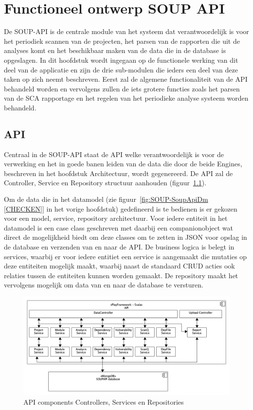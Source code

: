 
\chapter{Functioneel ontwerp SOUP API}\label{ch:impl soup api}
De SOUP-API is de centrale module van het systeem dat verantwoordelijk is voor het periodiek scannen van de projecten, het parsen van de rapporten die uit de analyses komt en het beschikbaar maken van de data die in de database is opgeslagen. In dit hoofdstuk wordt  ingegaan op de functionele werking van dit deel van de applicatie en zijn de drie sub-modulen die ieders een deel van deze taken op zich neemt beschreven. Eerst zal de algemene functionaliteit van de API behandeld worden en vervolgens zullen de iets grotere functies zoals het parsen van de SCA rapportage en het regelen van het periodieke analyse systeem worden behandeld.


\section{API}\label{sec:api2}
Centraal in de SOUP-API staat de API welke verantwoordelijk is voor de verwerking en het in goede banen leiden van de data die door de beide Engines, beschreven in het hoofdstuk Architectuur, wordt gegenereerd. De API zal de Controller, Service en Repository structuur aanhouden (figuur~\ref{fig:API components}).

Om de data die in het datamodel (zie figuur~\ref{fig:SOUP-SoupApiDm [CHECKEN]} in het vorige hoofdstuk) gedefineerd is te bedienen is er gekozen voor een model, service, repository architectuur. Voor iedere entiteit in het datamodel is een case class geschreven met daarbij een companionobject wat direct de mogelijkheid biedt om deze classes om te zetten in JSON voor opslag in de database en verzenden van en naar de API. De business logica is belegt in services, waarbij er voor iedere entitiet een service is aangemaakt die mutaties op deze entiteiten mogelijk maakt, waarbij naast de standaard CRUD acties ook relaties tussen de entiteiten kunnen worden gemaakt. De repository maakt het vervolgens mogelijk om data van en naar de database te versturen.

\begin{figure}[bth]
    \myfloatalign
    \includegraphics[width=12cm]{gfx/umlet/exports/API-ComponentsDiagram}
    \caption{API components Controllers, Services en Repositories}
    \label{fig:API components}
\end{figure}



